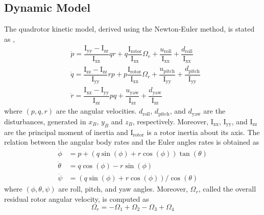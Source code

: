 \documentclass[conference]{IEEEtran}
\begin{document}
\subsection{Dynamic Model}
\noindent The quadrotor kinetic model, derived using the Newton-Euler method, is stated as  \cite{b15}, \cite{b16}
	\begin{align}
		&\dot p = \dfrac{\mathrm{I}_{\text{yy}} - \mathrm{I}_{\text{zz}}}{\mathrm{I}_{\text{xx}}} qr + q \dfrac{\mathrm{I}_{\text{rotor}}}{\mathrm{I}_{\text{xx}}}\Omega_r + \dfrac{u_{\text{roll}}}{\mathrm{I}_{\text{xx}}} + \dfrac{d_{\text{roll}}}{\mathrm{I}_{\text{xx}}}
		\\
	&\dot q = \dfrac{\mathrm{I}_{\text{zz}} - \mathrm{I}_{\text{zz}}}{\mathrm{I}_{\text{yy}}} rp + p \dfrac{\mathrm{I}_{\text{rotor}}}{\mathrm{I}_{\text{xx}}}\Omega_r + \dfrac{u_{\text{pitch}}}{\mathrm{I}_{\text{yy}}} + \dfrac{d_{\text{pitch}}}{\mathrm{I}_{\text{yy}}}
	\\
	&\dot r = \dfrac{\mathrm{I}_{\text{xx}} - \mathrm{I}_{\text{yy}}}{\mathrm{I}_{\text{zz}}} pq  +  \dfrac{u_{\text{yaw}}}{\mathrm{I}_{\text{zz}}} + \dfrac{d_{\text{yaw}}}{\mathrm{I}_{\text{zz}}}
	\end{align}
where $(p, q, r)$ are the angular velocities. $d_{\text{roll}}$, $d_{\text{pitch}}$, and $d_{\text{yaw}}$ are the disturbances, generated in $x_B$, $y_B$ and $z_B$, respectively. Moreover, $\mathrm{I}_{\text{xx}}$, $\mathrm{I}_{\text{yy}}$, and $\mathrm{I}_{\text{zz}}$ are the principal moment of inertia and $\mathrm{I}_{\text{rotor}}$ is a rotor  inertia  about its axis.
The relation between the angular body rates and the Euler angles rates is obtained as
\begin{align}
		\dot\phi &= p + (q\sin(\phi) + r\cos(\phi))\tan(\theta)\\
	\dot \theta &= q\cos(\phi) - r\sin(\phi)\\
	\dot\psi &= (q\sin(\phi) + r\cos(\phi))/{\cos(\theta)}
\end{align}
where $(\phi, \theta, \psi)$ are roll, pitch, and yaw angles.
Moreover, $\Omega_r$, called the overall residual rotor angular velocity, is computed as
\begin{equation}
	\Omega_r = -\Omega_1 + \Omega_2 - \Omega_3 + \Omega_4
\end{equation}
\end{document}
